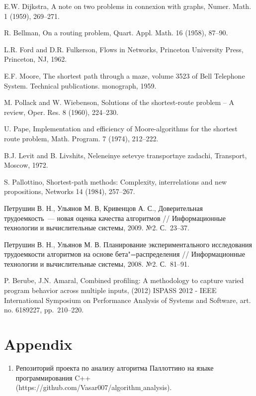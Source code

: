 \documentclass[a4paper]{article}
\begin{document}
\begin{enumerate}
	 E.W. Dijkstra, A note on two problems in connexion with graphs, Numer. Math. 1 (1959), 269–271.
	
	 R. Bellman, On a routing problem, Quart. Appl. Math. 16 (1958), 87–90.
	
	 L.R. Ford and D.R. Fulkerson, Flows in Networks, Princeton University Press, Princeton, NJ, 1962.
	
	 E.F. Moore, The shortest path through a maze, volume 3523 of Bell Telephone System. Technical publications. monograph, 1959.
	
	 M. Pollack and W. Wiebenson, Solutions of the shortest-route problem – A review, Oper. Res. 8 (1960), 224–230.
	
	 U. Pape, Implementation and efficiency of Moore-algorithms for the shortest route problem, Math. Program. 7 (1974), 212–222.
	
	 B.J. Levit and B. Livshits, Neleneinye setevye transportnye zadachi, Transport, Moscow, 1972.
	
	 S. Pallottino, Shortest-path methods: Complexity, interrelations and new propositions, Networks 14 (1984), 257–267.
	
	 Петрушин В. Н., Ульянов М. В, Кривенцов А. С., Доверительная трудоемкость~--- новая оценка качества алгоритмов // Информационные технологии и вычислительные системы, 2009. №2. С.~23--37.
	
	 Петрушин В. Н., Ульянов М. В. Планирование экспериментального исследования трудоемкости алгоритмов на основе бета"=распределения // Информационные технологии и вычислительные системы, 2008. №2. С.~81--91.
	
	 P. Berube, J.N. Amaral, Combined profiling: A methodology to capture varied program behavior across multiple inputs, (2012) ISPASS 2012 - IEEE International Symposium on Performance Analysis of Systems and Software, art. no. 6189227, pp.~210--220.
\end{enumerate}

\appendix
\section{Appendix} \label{sec:appendix}

\begin{enumerate}
	\item Репозиторий проекта по анализу алгоритма Паллоттино на языке программирования C++ \\ (https://github.com/Vasar007/algorithm$\_$analysis). \label{appendix1}
\end{enumerate}
\end{document}
